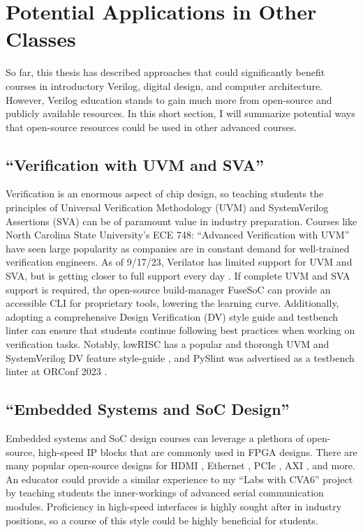 
\chapter{Potential Applications in Other Classes}
\label{chapter:other_classes}

So far, this thesis has described approaches that could significantly benefit courses in introductory Verilog, digital design, and computer architecture. However, Verilog education stands to gain much more from open-source and publicly available resources. In this short section, I will summarize potential ways that open-source resources could be used in other advanced courses.

\section{\enquote{Verification with UVM and SVA}}

Verification is an enormous aspect of chip design, so teaching students the principles of Universal Verification Methodology (UVM) and SystemVerilog Assertions (SVA) can be of paramount value in industry preparation. Courses like North Carolina State University's ECE 748: \enquote{Advanced Verification with UVM} have seen large popularity as companies are in constant demand for well-trained verification engineers. As of 9/17/23, Verilator has limited support for UVM and SVA, but is getting closer to full support every day \cite{VerilatorUVM, BieganskiORConf, VerilatorSVA}. If complete UVM and SVA support is required, the open-source build-manager FuseSoC can provide an accessible CLI for proprietary tools, lowering the learning curve. Additionally, adopting a comprehensive Design Verification (DV) style guide and testbench linter can ensure that students continue following best practices when working on verification tasks. Notably, lowRISC has a popular and thorough UVM and SystemVerilog DV feature style-guide \cite{lowRISCstyleguides}, and PySlint was advertised as a testbench linter at ORConf 2023 \cite{paulORConf}.

\section{\enquote{Embedded Systems and SoC Design}}

Embedded systems and SoC design courses can leverage a plethora of open-source, high-speed IP blocks that are commonly used in FPGA designs. There are many popular open-source designs for HDMI \cite{hdlutilhdmiGitHub, projfdisplaycontrollerGitHub, cliffordwolfSimpleVOutGitHub}, Ethernet \cite{alexforencichverilogethernetGitHub}, PCIe \cite{alexforencichverilogpcieGitHub, enjoydigitallitepcieGitHub}, AXI \cite{pulpplatformaxiGitHub, alexforencichverilogaxiGitHub}, and more. An educator could provide a similar experience to my \enquote{Labs with CVA6} project by teaching students the inner-workings of advanced serial communication modules. Proficiency in high-speed interfaces is highly sought after in industry positions, so a course of this style could be highly beneficial for students.

